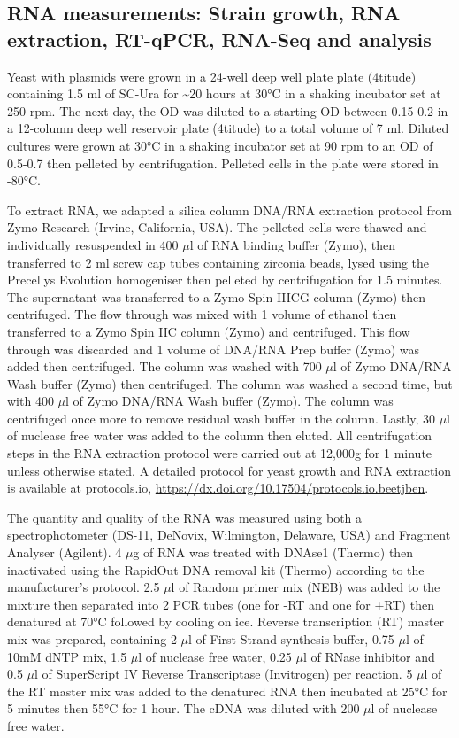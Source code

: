 \documentclass[../main.tex]{subfiles}
\begin{document}
\subsection{RNA measurements: Strain growth, RNA extraction, RT-qPCR, RNA-Seq and analysis}

Yeast with plasmids were grown in a 24-well deep well plate plate (4titude) containing 1.5 ml of SC-Ura for \textasciitilde20 hours at 30°C in a shaking incubator set at 250 rpm.
The next day, the OD was diluted to a starting OD between 0.15-0.2 in a 12-column deep well reservoir plate (4titude) to a total volume of 7 ml.
Diluted cultures were grown at 30°C in a shaking incubator set at 90 rpm to an OD of 0.5-0.7 then pelleted by centrifugation.
Pelleted cells in the plate were stored in -80°C.

To extract RNA, we adapted a silica column DNA/RNA extraction protocol from Zymo Research (Irvine, California, USA).
The pelleted cells were thawed and individually resuspended in 400 \(\mu\)l of RNA binding buffer (Zymo), then transferred to 2 ml screw cap tubes containing zirconia beads, lysed using the Precellys Evolution homogeniser then pelleted by centrifugation for 1.5 minutes.
The supernatant was transferred to a Zymo Spin IIICG column (Zymo) then centrifuged. The flow through was mixed with 1 volume of ethanol then transferred to a Zymo Spin IIC column (Zymo) and centrifuged.
This flow through was discarded and 1 volume of DNA/RNA Prep buffer (Zymo) was added then centrifuged.
The column was washed with 700 \(\mu\)l of Zymo DNA/RNA Wash buffer (Zymo) then centrifuged.
The column was washed a second time, but with 400 \(\mu\)l of Zymo DNA/RNA Wash buffer (Zymo).
The column was centrifuged once more to remove residual wash buffer in the column. Lastly, 30 \(\mu\)l of nuclease free water was added to the column then eluted.
All centrifugation steps in the RNA extraction protocol were carried out at 12,000g for 1 minute unless otherwise stated.
A detailed protocol for yeast growth and RNA extraction is available at protocols.io, \url{https://dx.doi.org/10.17504/protocols.io.beetjben}.

The quantity and quality of the RNA was measured using both a spectrophotometer (DS-11, DeNovix, Wilmington, Delaware, USA) and Fragment Analyser (Agilent).
4 \(\mu\)g of RNA was treated with DNAse1 (Thermo) then inactivated using the RapidOut DNA removal kit (Thermo) according to the manufacturer's protocol.
2.5 \(\mu\)l of Random primer mix (NEB) was added to the mixture then separated into 2 PCR tubes (one for -RT and one for +RT) then denatured at 70°C followed by cooling on ice.
Reverse transcription (RT) master mix was prepared, containing 2 \(\mu\)l of First Strand synthesis buffer, 0.75 \(\mu\)l of 10mM dNTP mix, 1.5 \(\mu\)l of nuclease free water, 0.25 \(\mu\)l of RNase inhibitor and 0.5 \(\mu\)l of SuperScript IV Reverse Transcriptase (Invitrogen) per reaction.
5 \(\mu\)l of the RT master mix was added to the denatured RNA then incubated at 25°C for 5 minutes then 55°C for 1 hour. The cDNA was diluted with 200 \(\mu\)l of nuclease free water.
\end{document}
